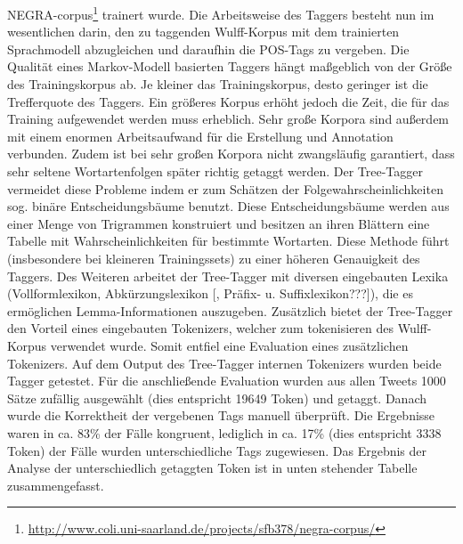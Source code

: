 \documentclass[11pt]{article}
\begin{document}
NEGRA-corpus\footnote{\url{http://www.coli.uni-saarland.de/projects/sfb378/negra-corpus/}}
trainert wurde. Die Arbeitsweise des Taggers besteht nun im wesentlichen darin,
den zu taggenden Wulff-Korpus mit dem trainierten Sprachmodell abzugleichen und
daraufhin die POS-Tags zu vergeben.  \newline
Die Qualität eines Markov-Modell basierten Taggers hängt maßgeblich von der Größe des Trainingskorpus ab.
Je kleiner das Trainingskorpus, desto geringer ist die Trefferquote des Taggers. Ein größeres Korpus erhöht 
jedoch die Zeit, die für das Training aufgewendet werden muss erheblich. Sehr große Korpora sind außerdem 
mit einem enormen Arbeitsaufwand für die Erstellung und Annotation verbunden. 
Zudem ist bei sehr großen Korpora nicht zwangsläufig garantiert, dass sehr
seltene Wortartenfolgen später richtig getaggt werden. \newline
Der Tree-Tagger vermeidet diese Probleme indem er zum Schätzen
der Folgewahrscheinlichkeiten sog. binäre Entscheidungsbäume benutzt. Diese
Entscheidungsbäume werden aus einer Menge von Trigrammen konstruiert und
besitzen an ihren Blättern eine Tabelle mit Wahrscheinlichkeiten für bestimmte
Wortarten. Diese Methode führt (insbesondere bei kleineren Trainingssets) zu
einer höheren Genauigkeit des Taggers. Des Weiteren arbeitet der Tree-Tagger mit
diversen eingebauten Lexika (Vollformlexikon, Abkürzungslexikon [, Präfix- u. Suffixlexikon???]), die es
ermöglichen Lemma-Informationen auszugeben. \newline
Zusätzlich bietet der Tree-Tagger den Vorteil eines eingebauten
Tokenizers, welcher zum tokenisieren des Wulff-Korpus verwendet wurde.
Somit entfiel eine Evaluation eines zusätzlichen Tokenizers. Auf dem Output des Tree-Tagger internen Tokenizers
wurden beide Tagger getestet. Für die anschließende Evaluation wurden aus
allen Tweets 1000 Sätze zufällig ausgewählt (dies entspricht 19649
Token) und getaggt. Danach wurde die Korrektheit der vergebenen Tags manuell
überprüft. Die Ergebnisse waren in ca. 83\% der Fälle kongruent, lediglich in
ca. 17\% (dies entspricht 3338 Token) der Fälle wurden unterschiedliche Tags
zugewiesen. Das Ergebnis der Analyse der unterschiedlich getaggten Token ist in unten stehender Tabelle
zusammengefasst. \newline
\end{document}

